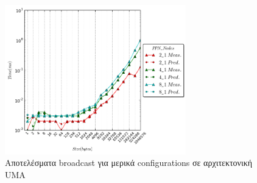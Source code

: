 \begin{figure}[ht]
    \centering
     \captionsetup{justification=centering,margin=0cm,font=footnotesize}
    \includegraphics[width=0.7\textwidth]{./images/broadcast/bcast.png}
    \caption{Αποτελέσματα broadcast για μερικά configurations σε αρχιτεκτονική UMA}
    \label{fig:bcast_conf}
\end{figure}

